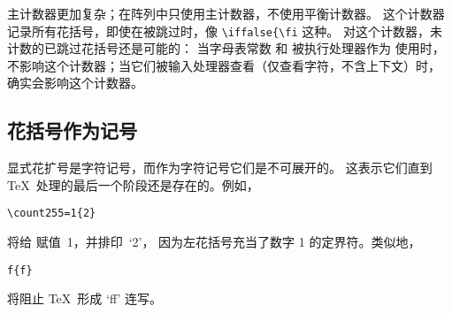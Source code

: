 \documentclass[letterpaper]{book}
\begin{document}
主计数器更加复杂；在阵列中只使用主计数器，不使用平衡计数器。
这个计数器记录所有花括号，即使在被跳过时，像 \verb>\iffalse{\fi> 这种。
对这个计数器，未计数的已跳过花括号还是可能的：
当字母表常数  和  被执行处理器作为  使用时，
不影响这个计数器；当它们被输入处理器查看（仅查看字符，不含上下文）时，
确实会影响这个计数器。

\subsection{花括号作为记号}

显式花扩号是字符记号，而作为字符记号它们是不可展开的。
这表示它们直到 \TeX\ 处理的最后一个阶段还是存在的。例如，
\begin{verbatim}
\count255=1{2}
\end{verbatim}
将给  赋值~1，并排印~`2'，
因为左花括号充当了数字 1 的定界符。类似地，
\begin{verbatim}
f{f}
\end{verbatim}
将阻止 \TeX\ 形成 `\hbox{ff}' 连写。
\end{document}
